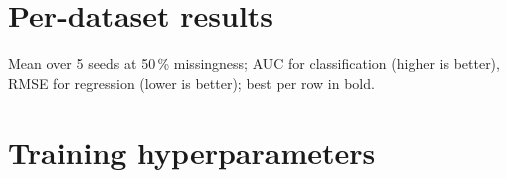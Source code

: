 \documentclass[11pt]{article}
\begin{document}
\begin{table}[!htbp]
\centering\small
\caption{The 20 datasets of the benchmark.}

\end{table}
\FloatBarrier

\section{Per-dataset results}
\label{app:perdataset}

Mean over 5 seeds at 50\,\% missingness; AUC for classification (higher is better), RMSE
for regression (lower is better); best per row in bold.

\begin{table}[!htbp]
\centering\small
\caption{Held-out source with offset (block\_shift, rate 0.5).}

\end{table}

\begin{table}[!htbp]
\centering\small
\caption{Held-out source without offset (block, rate 0.5).}

\end{table}

\begin{table}[!htbp]
\centering\small
\caption{Random split with offset (block\_shift, rate 0.5).}

\end{table}

\begin{table}[!htbp]
\centering\small
\caption{Complete data (no deleted cells), random split.}

\end{table}
\FloatBarrier

\section{Training hyperparameters}
\label{app:hparams}
\end{document}
